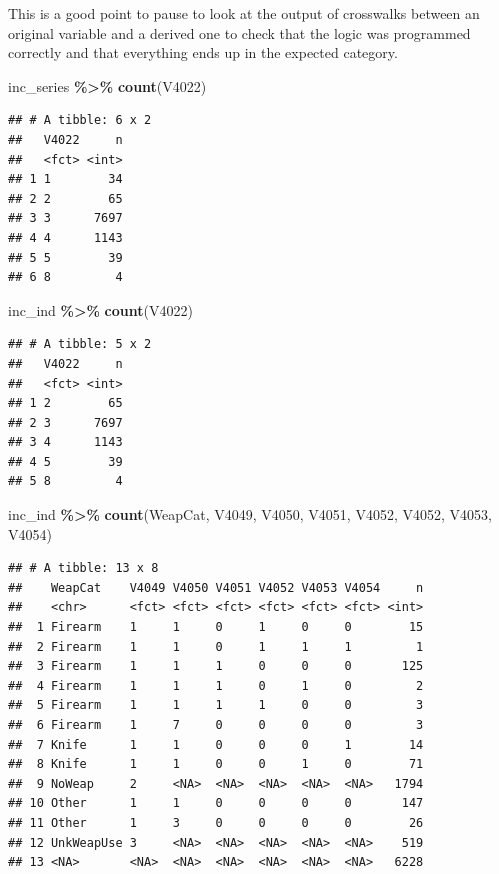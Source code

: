 \documentclass[
]{krantz}
\makeatletter
\newenvironment{Shaded}{\begin{snugshade}}{\end{snugshade}}
\newcommand{\FunctionTok}[1]{\textcolor[rgb]{0.27,0.27,0.27}{\textbf{#1}}}
\newcommand{\NormalTok}[1]{#1}
\newcommand{\SpecialCharTok}[1]{\textcolor[rgb]{0.43,0.43,0.43}{\textbf{#1}}}
\newenvironment{kframe}{%
\medskip{}
\setlength{\fboxsep}{.8em}
 \def\at@end@of@kframe{}%
 \ifinner\ifhmode%
  \def\at@end@of@kframe{\end{minipage}}%
  \begin{minipage}{\columnwidth}%
 \fi\fi%
 \def\FrameCommand##1{\hskip\@totalleftmargin \hskip-\fboxsep
 \colorbox{shadecolor}{##1}\hskip-\fboxsep
     \hskip-\linewidth \hskip-\@totalleftmargin \hskip\columnwidth}%
 \MakeFramed {\advance\hsize-\width
   \@totalleftmargin\z@ \linewidth\hsize
   \@setminipage}}%
 {\par\unskip\endMakeFramed%
 \at@end@of@kframe}
\renewenvironment{Shaded}{\begin{kframe}}{\end{kframe}}
\makeatother
\begin{document}
This is a good point to pause to look at the output of crosswalks between an original variable and a derived one to check that the logic was programmed correctly and that everything ends up in the expected category.

\begin{Shaded}
\begin{Highlighting}[]
\NormalTok{inc\_series }\SpecialCharTok{\%\textgreater{}\%} \FunctionTok{count}\NormalTok{(V4022)}
\end{Highlighting}
\end{Shaded}

\begin{verbatim}
## # A tibble: 6 x 2
##   V4022     n
##   <fct> <int>
## 1 1        34
## 2 2        65
## 3 3      7697
## 4 4      1143
## 5 5        39
## 6 8         4
\end{verbatim}

\begin{Shaded}
\begin{Highlighting}[]
\NormalTok{inc\_ind }\SpecialCharTok{\%\textgreater{}\%} \FunctionTok{count}\NormalTok{(V4022)}
\end{Highlighting}
\end{Shaded}

\begin{verbatim}
## # A tibble: 5 x 2
##   V4022     n
##   <fct> <int>
## 1 2        65
## 2 3      7697
## 3 4      1143
## 4 5        39
## 5 8         4
\end{verbatim}

\begin{Shaded}
\begin{Highlighting}[]
\NormalTok{inc\_ind }\SpecialCharTok{\%\textgreater{}\%}
  \FunctionTok{count}\NormalTok{(WeapCat, V4049, V4050, V4051, V4052, V4052, V4053, V4054)}
\end{Highlighting}
\end{Shaded}

\begin{verbatim}
## # A tibble: 13 x 8
##    WeapCat    V4049 V4050 V4051 V4052 V4053 V4054     n
##    <chr>      <fct> <fct> <fct> <fct> <fct> <fct> <int>
##  1 Firearm    1     1     0     1     0     0        15
##  2 Firearm    1     1     0     1     1     1         1
##  3 Firearm    1     1     1     0     0     0       125
##  4 Firearm    1     1     1     0     1     0         2
##  5 Firearm    1     1     1     1     0     0         3
##  6 Firearm    1     7     0     0     0     0         3
##  7 Knife      1     1     0     0     0     1        14
##  8 Knife      1     1     0     0     1     0        71
##  9 NoWeap     2     <NA>  <NA>  <NA>  <NA>  <NA>   1794
## 10 Other      1     1     0     0     0     0       147
## 11 Other      1     3     0     0     0     0        26
## 12 UnkWeapUse 3     <NA>  <NA>  <NA>  <NA>  <NA>    519
## 13 <NA>       <NA>  <NA>  <NA>  <NA>  <NA>  <NA>   6228
\end{verbatim}
\end{document}
